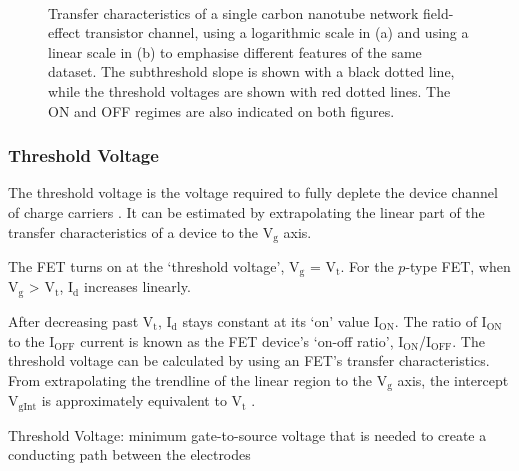 \documentclass[
  a4paper,
]{scrbook}
\begin{document}
\begin{figure}
\begin{minipage}[t]{0.45\linewidth}
{{}

}

\end{minipage}%
%
\begin{minipage}[t]{0.01\linewidth}

{\centering 

~

}

\end{minipage}%

\caption{\label{fig-literature-characteristics}Transfer characteristics
of a single carbon nanotube network field-effect transistor channel,
using a logarithmic scale in (a) and using a linear scale in (b) to
emphasise different features of the same dataset. The subthreshold slope
is shown with a black dotted line, while the threshold voltages are
shown with red dotted lines. The ON and OFF regimes are also indicated
on both figures.}

\end{figure}

\hypertarget{threshold-voltage}{%
\subsubsection*{Threshold Voltage}\label{threshold-voltage}}

The threshold voltage is the voltage required to fully deplete the
device channel of charge carriers \autocite{Martel1998}. It can be
estimated by extrapolating the linear part of the transfer
characteristics of a device to the V\(_\textrm{g}\) axis.

The FET turns on at the `threshold voltage', V\(_\textrm{g}\) =
V\(_\textrm{t}\). For the \(p\)-type FET, when V\(_\textrm{g}\)
\textgreater{} V\(_\textrm{t}\), I\(_\textrm{d}\) increases linearly.

After decreasing past V\(_\textrm{t}\), I\(_\textrm{d}\) stays constant
at its `on' value I\(_\textrm{ON}\). The ratio of I\(_\textrm{ON}\) to
the I\(_\textrm{OFF}\) current is known as the FET device's `on-off
ratio', I\(_\textrm{ON}\)/I\(_\textrm{OFF}\). The threshold voltage can
be calculated by using an FET's transfer characteristics. From
extrapolating the trendline of the linear region to the V\(_\textrm{g}\)
axis, the intercept V\(_\textrm{gInt}\) is approximately equivalent to
V\(_\textrm{t}\) \autocite{Sze2006}.

Threshold Voltage: minimum gate-to-source voltage that is needed to
create a conducting path between the electrodes
\end{document}
